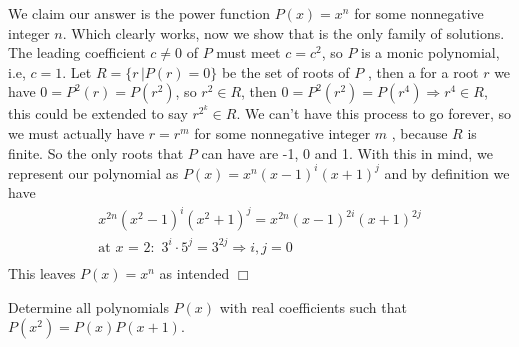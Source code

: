 \begin{solution}
    We claim our answer is the power function $P(x) = x^{n}$ for some nonnegative integer $n$. Which clearly works, now we show that is the only family of solutions. \\[3mm]
    The leading coefficient $c \neq 0$ of $P$ must meet $c = c^2$, so $P$ is a monic polynomial, i.e, $c=1$.
    Let $R = \{ r \, | P(r) = 0 \}$ be the set of roots of $P$ , then a for a root $r$ we have $0 = P^2(r) = P(r^2)$, so $r^2 \in R$, then $0 = P^2(r^2) = P(r^4) \Rightarrow r^4 \in R$, this could be extended to say $r^{2^k} \in R$. We can't have this process to go forever, so we must actually have $r = r^m$ for some nonnegative integer $m$ , because $R$ is finite. So the only roots that $P$ can have are -1, 0 and 1. With this in mind, we represent our polynomial as $P(x) = x^n (x-1)^i (x+1)^j$ and by definition we have
    \begin{align*}
        x^{2n} (x^2-1)^i (x^2 + 1)^j = x^{2n} (x-1)^{2i} (x+1)^{2j} \\ 
        \text{at $x$ = 2: } \, 3^i \cdot 5^j = 3^{2j} \Rightarrow i,j=0 \\
    \end{align*}
    This leaves $P(x) = x^n$ as intended $\Box$
\end{solution}

\begin{problem}
    Determine all polynomials \( P(x) \) with real coefficients such that \( P(x^2) = P(x)P(x+1) \).
\end{problem}

